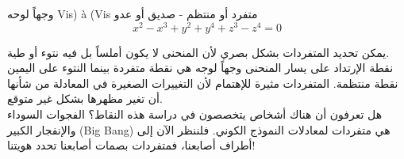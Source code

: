 \begin{surferPage}{وجهاً لوحه Vis) à (Vis}
متفرد أو منتظم - صديق أو عدو\\
\smallskip
\[x^2	- x^3+ y^2+ y^4+ z^3- z^4	=  0\]

\vspace{0.3cm}
يمكن تحديد المتفردات بشكل بصري لأن المنحنى لا يكون أملساً بل فيه نتوء أو طية.\\
\vspace{0.3cm}
نقطة الإرتداد على يسار المنحنى وجهاً لوجه هي نقطة متفردة بينما النتوء على اليمين نقطة منتظمة. المتفردات مثيرة للإهتمام لأن التغييرات الصغيرة في المعادلة من شأنها أن تغير مظهرها بشكل غير متوقع. \\ 

\vspace{0.3cm}
هل تعرفون أن هناك أشخاص يتخصصون في دراسة هذه النقاط؟ الفجوات السوداء والإنفجار الكبير
 \textenglish{(Big Bang)}
  هي متفردات لمعادلات النموذج الكوني. فلننظر الآن إلى أطراف أصابعنا، فمتفردات بصمات أصابعنا تحدد هويتنا!
\end{surferPage}
